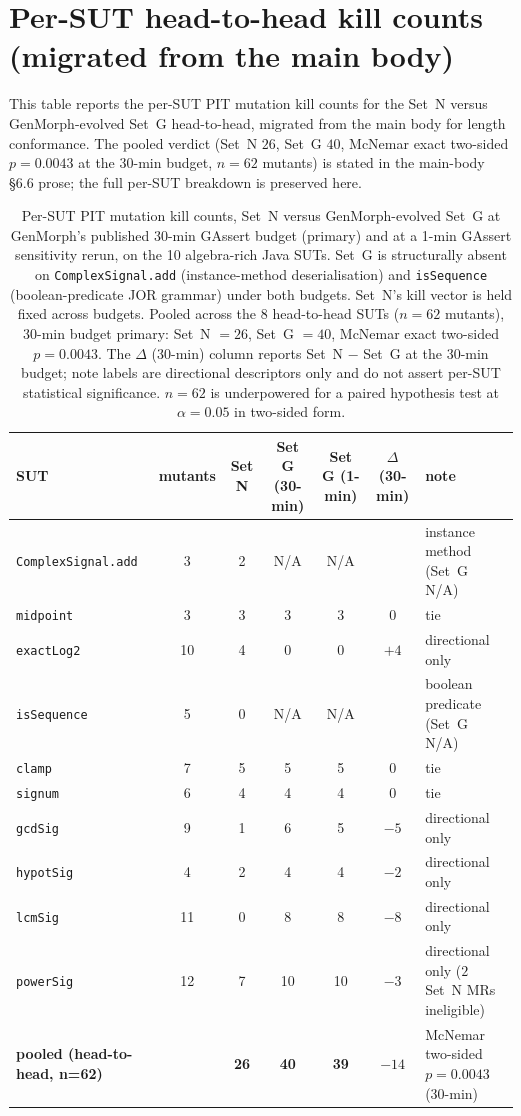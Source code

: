 \section{Per-SUT head-to-head kill counts (migrated from the main body)}
\label{app:detailed-tables-persut}

This table reports the per-SUT PIT mutation kill counts for the Set~N versus
GenMorph-evolved Set~G head-to-head, migrated from the main body for length
conformance. The pooled verdict (Set~N $26$, Set~G $40$, McNemar exact
two-sided $p = 0.0043$ at the 30-min budget, $n = 62$ mutants) is stated in the
main-body §6.6 prose; the full per-SUT breakdown is preserved here.

\begin{table}[h]
\centering
\caption{Per-SUT PIT mutation kill counts, Set~N versus
GenMorph-evolved Set~G at GenMorph's published 30-min GAssert budget
(primary) and at a 1-min GAssert sensitivity rerun, on the 10
algebra-rich Java SUTs. Set~G is structurally absent on
\texttt{ComplexSignal.add} (instance-method deserialisation) and
\texttt{isSequence} (boolean-predicate JOR grammar) under both budgets.
Set~N's kill vector is held fixed across budgets. Pooled across the
8 head-to-head SUTs ($n = 62$ mutants), 30-min budget primary: Set~N
$= 26$, Set~G $= 40$, McNemar exact two-sided $p = 0.0043$. The
$\Delta$ (30-min) column reports Set~N $-$ Set~G at the 30-min budget;
note labels are directional descriptors only and do not assert
per-SUT statistical significance. $n = 62$ is underpowered for a paired
hypothesis test at $\alpha = 0.05$ in two-sided form.}
\label{tab:algebra-rich-pooled-s9}
\small
\begin{tabular}{lcccccl}
\toprule
SUT & mutants & Set N & Set G (30-min) & Set G (1-min) & $\Delta$ (30-min) & note \\
\midrule
\texttt{ComplexSignal.add} &  3 & 2 & N/A & N/A &      & instance method (Set~G N/A) \\
\texttt{midpoint}          &  3 & 3 & 3   & 3   & $0$  & tie \\
\texttt{exactLog2}         & 10 & 4 & 0   & 0   & $+4$ & directional only \\
\texttt{isSequence}        &  5 & 0 & N/A & N/A &      & boolean predicate (Set~G N/A) \\
\texttt{clamp}             &  7 & 5 & 5   & 5   & $0$  & tie \\
\texttt{signum}            &  6 & 4 & 4   & 4   & $0$  & tie \\
\texttt{gcdSig}            &  9 & 1 & 6   & 5   & $-5$ & directional only \\
\texttt{hypotSig}          &  4 & 2 & 4   & 4   & $-2$ & directional only \\
\texttt{lcmSig}            & 11 & 0 & 8   & 8   & $-8$ & directional only \\
\texttt{powerSig}          & 12 & 7 & 10  & 10  & $-3$ & directional only ($2$ Set~N MRs ineligible) \\
\midrule
\textbf{pooled (head-to-head, n=62)}     &    & \textbf{26} & \textbf{40} & \textbf{39} & $-14$ & McNemar two-sided $p = 0.0043$ (30-min) \\
\bottomrule
\end{tabular}
\end{table}
